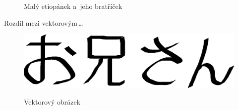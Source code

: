 \documentclass[11pt,a4paper,titlepage]{article}
\begin{document}
\begin{figure}[ht]
{{
}
\caption{Malý etiopánek a~jeho bratříček}
\label{fig:etiopan}}
\end{figure}

\newpage

Rozdíl mezi vektorovým\,\ldots
\begin{figure}[ht]
\begin{center}
\scalebox{0.4}
{\includegraphics{oniisan.eps}}
\caption{Vektorový obrázek}
\label{fig:Vect}
\end{center}
\end{figure}
\end{document}
